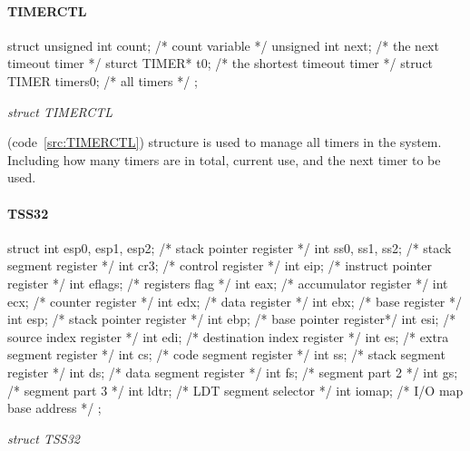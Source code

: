 \documentclass{swfcthesis}
\begin{document}
\paragraph{TIMERCTL}

\begin{listing}[H]
  \begin{codeblock}
\begin{ccode}
struct 
{ 
  unsigned int count;   /* count variable */
  unsigned int next;    /* the next timeout timer */
  sturct TIMER* t0;     /* the shortest timeout timer */
  struct TIMER timers0; /* all timers */
};
\end{ccode}
  \end{codeblock}
  \caption{\emph{struct TIMERCTL}}\label{src:TIMERCTL}
\end{listing}

(code~\ref{src:TIMERCTL}) structure is used to manage all timers in the system. Including
how many timers are in total, current use, and the next timer to be used.



\paragraph{TSS32}

\begin{listing}[H]
  \begin{codeblock}
\begin{ccode}
struct 
{ 
  int esp0, esp1, esp2; /* stack pointer register */
  int ss0, ss1, ss2;    /* stack segment register */
  int cr3;              /* control register */
  int eip;              /* instruct pointer register */
  int eflags;           /* registers flag */
  int eax;              /* accumulator register */
  int ecx;              /* counter register */
  int edx;              /* data register */
  int ebx;              /* base register */
  int esp;              /* stack pointer register */
  int ebp;              /* base pointer register*/
  int esi;              /* source index register */
  int edi;              /* destination index register */
  int es;               /* extra segment register */
  int cs;               /* code segment register */
  int ss;               /* stack segment register */
  int ds;               /* data segment register */
  int fs;               /* segment part 2 */
  int gs;               /* segment part 3 */
  int ldtr;             /* LDT segment selector */
  int iomap;            /* I/O map base address */
};
\end{ccode}
  \end{codeblock}
  \caption{\emph{struct TSS32}}\label{src:TSS32}
\end{listing}
\end{document}

